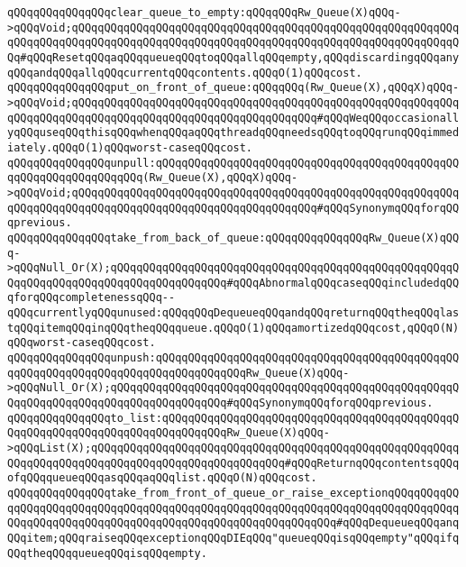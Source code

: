 \newline
\verb|qQQqqQQqqQQqqQQqclear_queue_to_empty:qQQqqQQqRw_Queue(X)qQQq->qQQqVoid;qQQqqQQqqQQqqQQqqQQqqQQqqQQqqQQqqQQqqQQqqQQqqQQqqQQqqQQqqQQqqQQqqQQqqQQqqQQqqQQqqQQqqQQqqQQqqQQqqQQqqQQqqQQqqQQqqQQqqQQqqQQqqQQqqQQq#qQQqResetqQQqaqQQqqueueqQQqtoqQQqallqQQqempty,qQQqdiscardingqQQqanyqQQqandqQQqallqQQqcurrentqQQqcontents.qQQqO(1)qQQqcost.|\newline
\newline
\verb|qQQqqQQqqQQqqQQqput_on_front_of_queue:qQQqqQQq(Rw_Queue(X),qQQqX)qQQq->qQQqVoid;qQQqqQQqqQQqqQQqqQQqqQQqqQQqqQQqqQQqqQQqqQQqqQQqqQQqqQQqqQQqqQQqqQQqqQQqqQQqqQQqqQQqqQQqqQQqqQQqqQQqqQQqqQQq#qQQqWeqQQqoccasionallyqQQquseqQQqthisqQQqwhenqQQqaqQQqthreadqQQqneedsqQQqtoqQQqrunqQQqimmediately.qQQqO(1)qQQqworst-caseqQQqcost.|\newline
\verb|qQQqqQQqqQQqqQQqunpull:qQQqqQQqqQQqqQQqqQQqqQQqqQQqqQQqqQQqqQQqqQQqqQQqqQQqqQQqqQQqqQQqqQQq(Rw_Queue(X),qQQqX)qQQq->qQQqVoid;qQQqqQQqqQQqqQQqqQQqqQQqqQQqqQQqqQQqqQQqqQQqqQQqqQQqqQQqqQQqqQQqqQQqqQQqqQQqqQQqqQQqqQQqqQQqqQQqqQQqqQQqqQQq#qQQqSynonymqQQqforqQQqprevious.|\newline
\newline
\verb|qQQqqQQqqQQqqQQqtake_from_back_of_queue:qQQqqQQqqQQqqQQqRw_Queue(X)qQQq->qQQqNull_Or(X);qQQqqQQqqQQqqQQqqQQqqQQqqQQqqQQqqQQqqQQqqQQqqQQqqQQqqQQqqQQqqQQqqQQqqQQqqQQqqQQqqQQqqQQq#qQQqAbnormalqQQqcaseqQQqincludedqQQqforqQQqcompletenessqQQq--qQQqcurrentlyqQQqunused:qQQqqQQqDequeueqQQqandqQQqreturnqQQqtheqQQqlastqQQqitemqQQqinqQQqtheqQQqqueue.qQQqO(1)qQQqamortizedqQQqcost,qQQqO(N)qQQqworst-caseqQQqcost.|\newline
\verb|qQQqqQQqqQQqqQQqunpush:qQQqqQQqqQQqqQQqqQQqqQQqqQQqqQQqqQQqqQQqqQQqqQQqqQQqqQQqqQQqqQQqqQQqqQQqqQQqqQQqqQQqRw_Queue(X)qQQq->qQQqNull_Or(X);qQQqqQQqqQQqqQQqqQQqqQQqqQQqqQQqqQQqqQQqqQQqqQQqqQQqqQQqqQQqqQQqqQQqqQQqqQQqqQQqqQQqqQQq#qQQqSynonymqQQqforqQQqprevious.|\newline
\newline
\verb|qQQqqQQqqQQqqQQqto_list:qQQqqQQqqQQqqQQqqQQqqQQqqQQqqQQqqQQqqQQqqQQqqQQqqQQqqQQqqQQqqQQqqQQqqQQqqQQqqQQqRw_Queue(X)qQQq->qQQqList(X);qQQqqQQqqQQqqQQqqQQqqQQqqQQqqQQqqQQqqQQqqQQqqQQqqQQqqQQqqQQqqQQqqQQqqQQqqQQqqQQqqQQqqQQqqQQqqQQqqQQq#qQQqReturnqQQqcontentsqQQqofqQQqqueueqQQqasqQQqaqQQqlist.qQQqO(N)qQQqcost.|\newline
\newline
\verb|qQQqqQQqqQQqqQQqtake_from_front_of_queue_or_raise_exceptionqQQqqQQqqQQqqQQqqQQqqQQqqQQqqQQqqQQqqQQqqQQqqQQqqQQqqQQqqQQqqQQqqQQqqQQqqQQqqQQqqQQqqQQqqQQqqQQqqQQqqQQqqQQqqQQqqQQqqQQqqQQqqQQqqQQq#qQQqDequeueqQQqanqQQqitem;qQQqraiseqQQqexceptionqQQqDIEqQQq"queueqQQqisqQQqempty"qQQqifqQQqtheqQQqqueueqQQqisqQQqempty.|\newline
